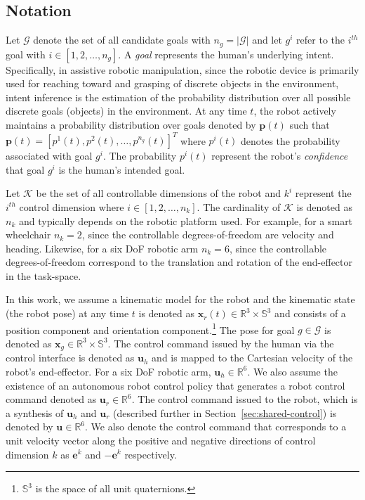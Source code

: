 \documentclass[natbib, twocolumn]{svjour3}          %
\begin{document}
\subsection{Notation}\label{ssec:notation}
Let $\mathcal{G}$ denote the set of all candidate goals with $n_g = \vert\mathcal{G}\vert$ and let $g^i$ refer to the $i^{th}$ goal with $i \in [1,2,\dots, n_g]$. A \textit{goal} represents the human's underlying intent. Specifically, in assistive robotic manipulation, since the robotic device is primarily used for reaching toward and grasping of discrete objects in the environment, intent inference is the estimation of the probability distribution over all possible discrete goals (objects) in the environment. At any time $t$, the robot actively maintains a probability distribution over goals denoted by $\boldsymbol{p}(t)$ such that $\boldsymbol{p}(t) = [p^1(t), p^2(t),\dots, p^{n_g}(t)]^{T}$ where $p^i(t)$ denotes the probability associated with goal $g^i$.  The probability $p^i(t)$ represent the robot's \textit{confidence} that goal $g^i$ is the human's intended goal. 

Let $\mathcal{K}$ be the set of all controllable dimensions of the robot and $k^i$ represent the $i^{th}$ control dimension where $i \in [1,2,\dots,n_k]$. The cardinality of $\mathcal{K}$ is denoted as $n_k$ and typically depends on the robotic platform used. For example, for a smart wheelchair $n_k = 2$, since the controllable degrees-of-freedom are velocity and heading. Likewise, for a six DoF robotic arm $n_k = 6$, since the controllable degrees-of-freedom correspond to the translation and rotation of the end-effector in the task-space. 

In this work, we assume a kinematic model for the robot and the kinematic state (the robot pose) at any time $t$ is denoted as $\boldsymbol{x}_r(t) \in \mathbb{R}^3 \times \mathbb{S}^3$ and consists of a position component and orientation component.\footnote{$\mathbb{S}^3$ is the space of all unit quaternions.} The pose for goal $g \in \mathcal{G}$ is denoted as $\boldsymbol{x}_g \in \mathbb{R}^3 \times \mathbb{S}^3$. The control command issued by the human via the control interface is denoted as $\boldsymbol{u}_h$ and is mapped to the Cartesian velocity of the robot's end-effector. For a six DoF robotic arm, $\boldsymbol{u}_h \in \mathbb{R}^6$. We also assume the existence of an autonomous robot control policy that generates a robot control command denoted as $\boldsymbol{u}_r \in \mathbb{R}^6$. The control command issued to the robot, which is a synthesis of $\boldsymbol{u}_h$ and $\boldsymbol{u}_r$ (described further in Section~\ref{sec:shared-control}) is denoted by $\boldsymbol{u} \in \mathbb{R}^6$. We also denote the control command that corresponds to a unit velocity vector along the positive and negative directions of control dimension $k$ as $\boldsymbol{e}^k$ and $-\boldsymbol{e}^k$ respectively.
\end{document}
